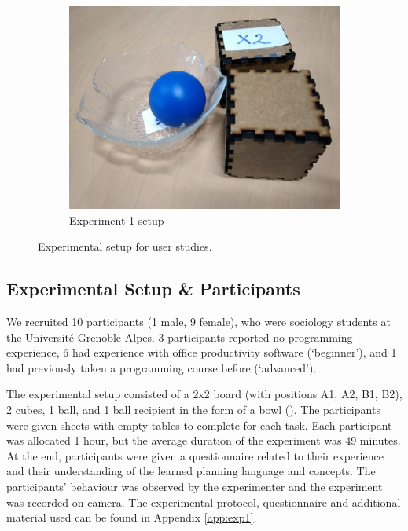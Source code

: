 \begin{figure}[htp]
\begin{subfigure}[t]{0.24\textwidth}
		\includegraphics[width=\textwidth]{figures/exp1-setup}%
		\caption{Experiment 1 setup}\label{fig:exp1-setup}%
	\end{subfigure} 	  
	\caption{Experimental setup for user studies.}
	\label{fig:pre-experiment}%
\end{figure}
\subsection{Experimental Setup \& Participants}
We recruited 10 participants (1 male, 9 female), who were sociology students at the Universit\'{e} Grenoble Alpes.
3 participants reported no programming experience, 6  had experience with office productivity software (`beginner'), and 1 had previously taken a programming course before (`advanced').

The experimental setup consisted of a 2x2 board (with positions A1, A2, B1, B2), 2 cubes, 1 ball, and 1 ball recipient in the form of a bowl ().
The participants were given sheets with empty tables to complete for each task.
Each participant was allocated 1 hour, but the average duration of the experiment was 49 minutes.
At the end, participants were given a questionnaire related to their experience and their understanding of the learned planning language and concepts.
The participants' behaviour was observed by the experimenter and the experiment was recorded on camera.
The experimental protocol, questionnaire and additional material used can be found in Appendix \ref{app:exp1}.


